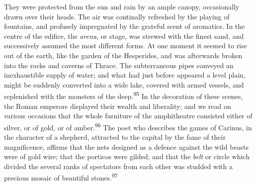 They were protected from the sun and rain by an ample canopy,
occasionally drawn over their heads. The air was continally
refreshed by the playing of fountains, and profusely impregnated
by the grateful scent of aromatics. In the centre of the edifice,
the \textit{arena}, or stage, was strewed with the finest sand, and
successively assumed the most different forms. At one moment it
seemed to rise out of the earth, like the garden of the
Hesperides, and was afterwards broken into the rocks and caverns
of Thrace. The subterraneous pipes conveyed an inexhaustible
supply of water; and what had just before appeared a level plain,
might be suddenly converted into a wide lake, covered with armed
vessels, and replenished with the monsters of the deep.\textsuperscript{95} In the
decoration of these scenes, the Roman emperors displayed their
wealth and liberality; and we read on various occasions that the
whole furniture of the amphitheatre consisted either of silver,
or of gold, or of amber.\textsuperscript{96} The poet who describes the games of
Carinus, in the character of a shepherd, attracted to the capital
by the fame of their magnificence, affirms that the nets designed
as a defence against the wild beasts were of gold wire; that the
porticos were gilded; and that the \textit{belt} or circle which divided
the several ranks of spectators from each other was studded with
a precious mosaic of beautiful stones.\textsuperscript{97}






